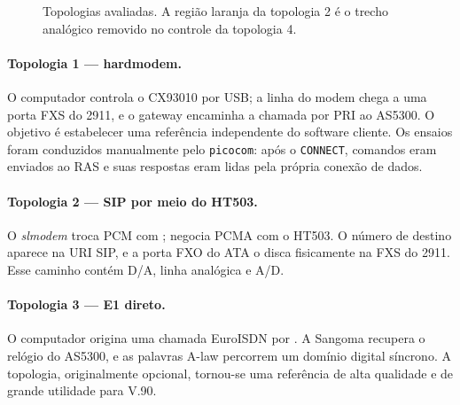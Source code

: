 \documentclass[12pt,a4paper]{article}
\newcommand{\slmodem}{\textit{slmodem}}
\newcommand{\arquivo}[1]{{\def\UrlLeft{}\def\UrlRight{}\path{#1}}}
\begin{document}
\begin{figure}[p]
\caption{Topologias avaliadas. A região laranja da topologia 2 é o trecho
analógico removido no controle da topologia 4.}
\label{fig:topologias}
\end{figure}

\paragraph{Topologia 1 — hardmodem.}
O computador controla o CX93010 por USB; a linha do modem chega a uma porta FXS
do 2911, e o gateway encaminha a chamada por PRI ao AS5300. O objetivo é estabelecer
uma referência independente do software cliente. Os ensaios foram conduzidos
manualmente pelo \texttt{picocom}: após o \texttt{CONNECT}, comandos eram enviados
ao RAS e suas respostas eram lidas pela própria conexão de dados.

\paragraph{Topologia 2 — SIP por meio do HT503.}
O \slmodem{} troca PCM com \arquivo{slmodem_bridge}; \arquivo{rtp_bridge} negocia
PCMA com o HT503. O número de destino aparece na URI SIP, e a porta FXO do ATA o
disca fisicamente na FXS do 2911. Esse caminho contém D/A, linha analógica e A/D.

\paragraph{Topologia 3 — E1 direto.}
O computador origina uma chamada EuroISDN por \arquivo{pri_call}. A Sangoma
recupera o relógio do AS5300, e as palavras A-law percorrem um domínio digital
síncrono. A topologia, originalmente opcional, tornou-se uma referência de alta
qualidade e de grande utilidade para V.90.
\end{document}
